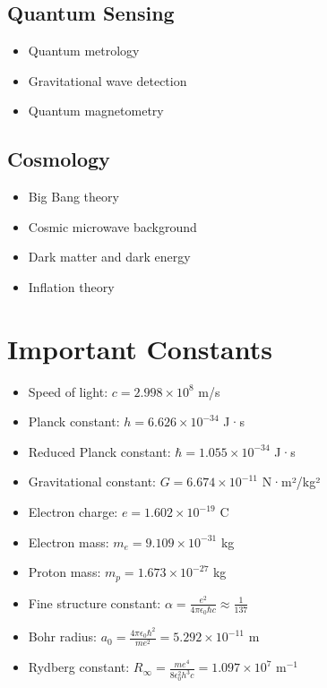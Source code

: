 \documentclass[11pt]{article}
\theoremstyle{definition}
\begin{document}
\subsection{Quantum Sensing}
\begin{itemize}
    \item Quantum metrology
    \item Gravitational wave detection
    \item Quantum magnetometry
\end{itemize}

\subsection{Cosmology}
\begin{itemize}
    \item Big Bang theory
    \item Cosmic microwave background
    \item Dark matter and dark energy
    \item Inflation theory
\end{itemize}

\section{Important Constants}

\begin{itemize}
    \item Speed of light: $c = 2.998 \times 10^8$ m/s
    \item Planck constant: $h = 6.626 \times 10^{-34}$ J·s
    \item Reduced Planck constant: $\hbar = 1.055 \times 10^{-34}$ J·s
    \item Gravitational constant: $G = 6.674 \times 10^{-11}$ N·m²/kg²
    \item Electron charge: $e = 1.602 \times 10^{-19}$ C
    \item Electron mass: $m_e = 9.109 \times 10^{-31}$ kg
    \item Proton mass: $m_p = 1.673 \times 10^{-27}$ kg
    \item Fine structure constant: $\alpha = \frac{e^2}{4\pi\epsilon_0\hbar c} \approx \frac{1}{137}$
    \item Bohr radius: $a_0 = \frac{4\pi\epsilon_0\hbar^2}{me^2} = 5.292 \times 10^{-11}$ m
    \item Rydberg constant: $R_\infty = \frac{me^4}{8\epsilon_0^2h^3c} = 1.097 \times 10^7$ m$^{-1}$
\end{itemize}
\end{document}
